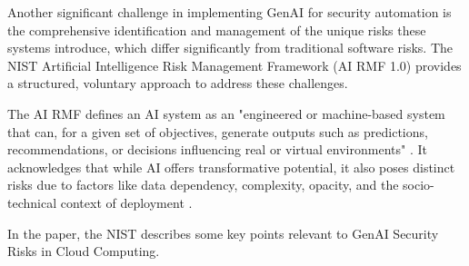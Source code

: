Another significant challenge in implementing GenAI for security automation is the comprehensive identification and management of the unique risks these systems introduce, which differ significantly from traditional software risks. The NIST Artificial Intelligence Risk Management Framework (AI RMF 1.0) \cite{tabassi_artificial_2023} provides a structured, voluntary approach to address these challenges.

The AI RMF defines an AI system as an "engineered or machine-based system that can, for a given set of objectives, generate outputs such as predictions, recommendations, or decisions influencing real or virtual environments" \cite[p.1]{tabassi_artificial_2023}. It acknowledges that while AI offers transformative potential, it also poses distinct risks due to factors like data dependency, complexity, opacity, and the socio-technical context of deployment \cite{tabassi_artificial_2023}.

In the paper, the NIST describes some key points relevant to GenAI Security Risks in Cloud Computing.

